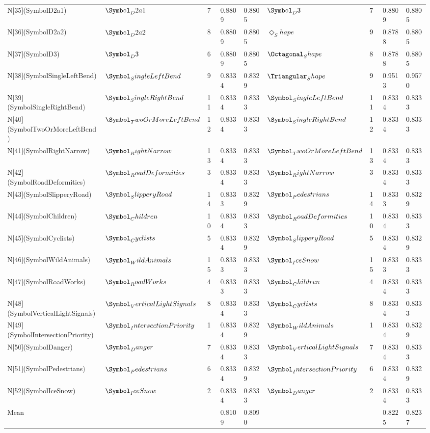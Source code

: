 \begin{tabular}{lllllllll}
N[35](SymbolD2a1) & $\Symbol_D2a1$ & 7 & 0.8809 & 0.8805 & $\Symbol_D3$ & 7 & 0.8809 & 0.8805 \\
N[36](SymbolD2a2) & $\Symbol_D2a2$ & 8 & 0.8809 & 0.8805 & $\Diamond_Shape$ & 9 & 0.8788 & 0.8805 \\
N[37](SymbolD3) & $\Symbol_D3$ & 6 & 0.8809 & 0.8805 & $\Octagonal_Shape$ & 8 & 0.8788 & 0.8805 \\
N[38](SymbolSingleLeftBend) & $\Symbol_SingleLeftBend$ & 9 & 0.8334 & 0.8329 & $\Triangular_Shape$ & 9 & 0.9513 & 0.9570 \\
N[39](SymbolSingleRightBend) & $\Symbol_SingleRightBend$ & 11 & 0.8334 & 0.8333 & $\Symbol_SingleLeftBend$ & 11 & 0.8334 & 0.8333 \\
N[40](SymbolTwoOrMoreLeftBend) & $\Symbol_TwoOrMoreLeftBend$ & 12 & 0.8334 & 0.8333 & $\Symbol_SingleRightBend$ & 12 & 0.8334 & 0.8333 \\
N[41](SymbolRightNarrow) & $\Symbol_RightNarrow$ & 13 & 0.8334 & 0.8333 & $\Symbol_TwoOrMoreLeftBend$ & 13 & 0.8334 & 0.8333 \\
N[42](SymbolRoadDeformities) & $\Symbol_RoadDeformities$ & 3 & 0.8334 & 0.8333 & $\Symbol_RightNarrow$ & 3 & 0.8334 & 0.8333 \\
N[43](SymbolSlipperyRoad) & $\Symbol_SlipperyRoad$ & 14 & 0.8333 & 0.8329 & $\Symbol_Pedestrians$ & 14 & 0.8333 & 0.8329 \\
N[44](SymbolChildren) & $\Symbol_Children$ & 10 & 0.8334 & 0.8333 & $\Symbol_RoadDeformities$ & 10 & 0.8334 & 0.8333 \\
N[45](SymbolCyclists) & $\Symbol_Cyclists$ & 5 & 0.8334 & 0.8329 & $\Symbol_SlipperyRoad$ & 5 & 0.8334 & 0.8329 \\
N[46](SymbolWildAnimals) & $\Symbol_WildAnimals$ & 15 & 0.8333 & 0.8333 & $\Symbol_IceSnow$ & 15 & 0.8333 & 0.8333 \\
N[47](SymbolRoadWorks) & $\Symbol_RoadWorks$ & 4 & 0.8333 & 0.8333 & $\Symbol_Children$ & 4 & 0.8334 & 0.8333 \\
N[48](SymbolVerticalLightSignals) & $\Symbol_VerticalLightSignals$ & 8 & 0.8334 & 0.8333 & $\Symbol_Cyclists$ & 8 & 0.8334 & 0.8333 \\
N[49](SymbolIntersectionPriority) & $\Symbol_IntersectionPriority$ & 1 & 0.8334 & 0.8329 & $\Symbol_WildAnimals$ & 1 & 0.8334 & 0.8329 \\
N[50](SymbolDanger) & $\Symbol_Danger$ & 7 & 0.8334 & 0.8333 & $\Symbol_VerticalLightSignals$ & 7 & 0.8334 & 0.8333 \\
N[51](SymbolPedestrians) & $\Symbol_Pedestrians$ & 6 & 0.8334 & 0.8329 & $\Symbol_IntersectionPriority$ & 6 & 0.8334 & 0.8329 \\
N[52](SymbolIceSnow) & $\Symbol_IceSnow$ & 2 & 0.8334 & 0.8333 & $\Symbol_Danger$ & 2 & 0.8334 & 0.8333 \\
Mean &  &  & 0.8109 & 0.8090 &  &  & 0.8225 & 0.8237 \\
\bottomrule
\end{tabular}
